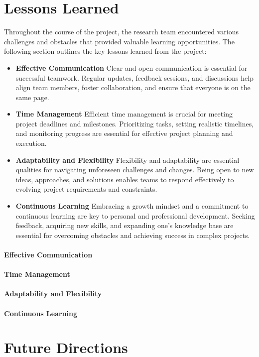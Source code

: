 \section{Lessons Learned}

Throughout the course of the project, the research team encountered various challenges and obstacles that provided valuable learning opportunities. 
The following section outlines the key lessons learned from the project:

\begin{itemize}
    \item \textbf{Effective Communication} Clear and open communication is essential for successful teamwork. Regular updates, feedback sessions, and discussions help align team members, foster collaboration, and ensure that everyone is on the same page.
    \item \textbf{Time Management} Efficient time management is crucial for meeting project deadlines and milestones. Prioritizing tasks, setting realistic timelines, and monitoring progress are essential for effective project planning and execution.
    \item \textbf{Adaptability and Flexibility} Flexibility and adaptability are essential qualities for navigating unforeseen challenges and changes. Being open to new ideas, approaches, and solutions enables teams to respond effectively to evolving project requirements and constraints.
    \item \textbf{Continuous Learning} Embracing a growth mindset and a commitment to continuous learning are key to personal and professional development. Seeking feedback, acquiring new skills, and expanding one’s knowledge base are essential for overcoming obstacles and achieving success in complex projects.
\end{itemize}


\paragraph{Effective Communication}

\paragraph{Time Management}

\paragraph{Adaptability and Flexibility}

\paragraph{Continuous Learning}

\section{Future Directions}%




